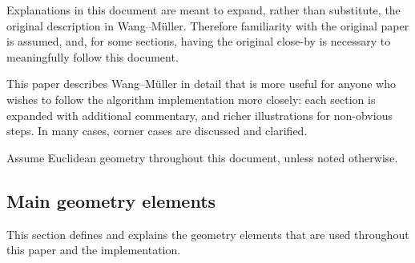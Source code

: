 \documentclass[a4paper]{article}
\newcommand{\WM}{Wang--M{\"u}ller}
\begin{document}
Explanations in this document are meant to expand, rather than substitute, the
original description in {\WM}. Therefore familiarity with the original paper is
assumed, and, for some sections, having the original close-by is necessary to
meaningfully follow this document.

This paper describes {\WM} in detail that is more useful for anyone who wishes
to follow the algorithm implementation more closely: each section is expanded
with additional commentary, and richer illustrations for non-obvious steps. In
many cases, corner cases are discussed and clarified.

Assume Euclidean geometry throughout this document, unless noted otherwise.

\subsection{Main geometry elements}
\label{sec:vocab}

This section defines and explains the geometry elements that are used
throughout this paper and the implementation.
\end{document}
